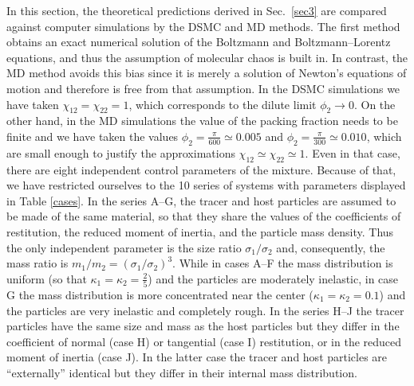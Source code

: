 \documentclass[aps,pre,reprint]{revtex4-1}
\newcommand{\q}{\kappa}
\begin{document}
In this section, the theoretical predictions derived in Sec.\ \ref{sec3} are compared
against computer simulations by the DSMC \cite{B94} and MD \cite{AW59,L91b} methods. The
first method obtains an exact numerical solution of the Boltzmann and
Boltzmann--Lorentz equations, and thus the assumption of molecular chaos is built
in. In contrast, the MD method avoids this bias since it is merely a solution of Newton's equations of motion and therefore is free from that assumption. In the DSMC simulations we have taken $\chi_{12}=\chi_{22}=1$, which corresponds to the dilute limit  $\phi_2\to 0$. On the other hand, in the MD simulations the value of the packing fraction needs to be finite and we have taken the values $\phi_2=\frac{\pi}{600}\simeq 0.005$ and $\phi_2=\frac{\pi}{300}\simeq 0.010$, which are small enough to justify the approximations $\chi_{12}\simeq\chi_{22}\simeq 1$.
Even in that case, there are eight independent control parameters of the mixture. Because of that, we have restricted ourselves to the 10 series of systems with parameters displayed in Table \ref{cases}.
In the series A--G, the tracer and host particles are assumed to be made of the same material, so that they share the values of the coefficients of restitution, the reduced moment of inertia, and the particle mass density. Thus the only independent parameter is the size ratio $\sigma_1/\sigma_2$ and, consequently, the mass ratio is $m_1/m_2=(\sigma_1/\sigma_2)^3$. While in cases A--F the mass distribution is uniform (so that $\q_1=\q_2=\frac{2}{5}$) and the particles are moderately inelastic, in case G the mass distribution is more concentrated near the center ($\q_1=\q_2=0.1$) and the particles are very inelastic and completely rough.
In the series H--J the tracer particles have the same size and mass as the host particles but they differ in the coefficient of normal  (case H) or tangential (case I) restitution, or in the reduced moment of inertia (case J). In the latter case the tracer and host particles are ``externally'' identical but they differ in their internal mass distribution.
\end{document}
